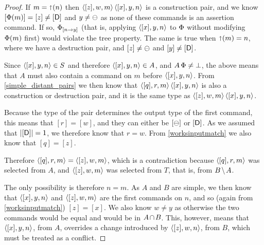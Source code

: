 \begin{proof}
If $m=\mathord{\shortuparrow}({n})$ then $\langle{[z],w,m}\rangle\,\langle{[x],y,n}\rangle$ is a construction pair, and we know
$[\Phi(m)]=[z]\neq[\mathsf{D}]$ and $y\neq\ominus$ as none of these commands is an assertion command.
If so, ${\Phi}_{[{n}\rightarrow{y}]}$ 
(that is, applying $\langle{[x],y,n}\rangle$ to $\Phi$ without modifying $\Phi(m)$ first) would violate the tree property.
The same is true when $\mathord{\shortuparrow}({m})=n$, where we have a destruction pair,
and $[z]\neq\ominus$ and $[y]\neq[\mathsf{D}]$.

Since $\langle{[x],y,n}\rangle\in S$ and therefore $\langle{[x],y,n}\rangle\in A$, and $A\,\Phi\neq\bot$,
the above means that $A$ must also contain a command on $m$ before $\langle{[x],y,n}\rangle$.
From \cref{simple_distant_pairs} we then know that $\langle{[q],r,m}\rangle\,\langle{[x],y,n}\rangle$
is also a construction or destruction pair, and it is the same type as
$\langle{[z],w,m}\rangle\,\langle{[x],y,n}\rangle$.

Because the type of the pair determines the output type of the first command,
this means that $[r]=[w]$, and they can either be $[\ominus]$ or $[\mathsf{D}]$.
As we assumed that $|[\mathsf{D}]|=1$, we therefore know that $r=w$.
From \cref{worksinputmatch} we also know that $[q]=[z]$.

Therefore $\langle{[q],r,m}\rangle = \langle{[z],w,m}\rangle$, which is a contradiction
because $\langle{[q],r,m}\rangle$ was selected from $A$, and
$\langle{[z],w,m}\rangle$ was selected from $T$, that is, from $\bmanp$.

The only possibility is therefore $n=m$.
As $A$ and $B$ are simple, we then know that
$\langle{[x],y,n}\rangle$ and $\langle{[z],w,m}\rangle$ are the first commands on $n$,
and so (again from \cref{worksinputmatch}) $[z]=[x]$.
We also know $w\neq y$ as otherwise the two commands would be equal and
would be in $\acbnp$.
This, however, means that $\langle{[x],y,n}\rangle$, from $A$, overrides a change introduced 
by $\langle{[z],w,n}\rangle$, from $B$, which must be treated as a conflict.
\end{proof}

